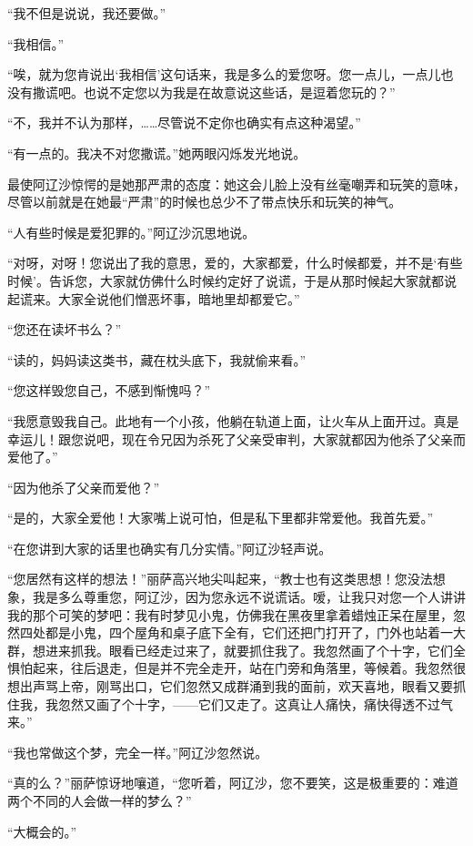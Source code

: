 \par “我不但是说说，我还要做。”
\par “我相信。”
\par “唉，就为您肯说出‘我相信’这句话来，我是多么的爱您呀。您一点儿，一点儿也没有撒谎吧。也说不定您以为我是在故意说这些话，是逗着您玩的？”
\par “不，我并不认为那样，……尽管说不定你也确实有点这种渴望。”
\par “有一点的。我决不对您撒谎。”她两眼闪烁发光地说。
\par 最使阿辽沙惊愕的是她那严肃的态度：她这会儿脸上没有丝毫嘲弄和玩笑的意味，尽管以前就是在她最“严肃”的时候也总少不了带点快乐和玩笑的神气。
\par “人有些时候是爱犯罪的。”阿辽沙沉思地说。
\par “对呀，对呀！您说出了我的意思，爱的，大家都爱，什么时候都爱，并不是‘有些时候’。告诉您，大家就仿佛什么时候约定好了说谎，于是从那时候起大家就都说起谎来。大家全说他们憎恶坏事，暗地里却都爱它。”
\par “您还在读坏书么？”
\par “读的，妈妈读这类书，藏在枕头底下，我就偷来看。”
\par “您这样毁您自己，不感到惭愧吗？”
\par “我愿意毁我自己。此地有一个小孩，他躺在轨道上面，让火车从上面开过。真是幸运儿！跟您说吧，现在令兄因为杀死了父亲受审判，大家就都因为他杀了父亲而爱他了。”
\par “因为他杀了父亲而爱他？”
\par “是的，大家全爱他！大家嘴上说可怕，但是私下里都非常爱他。我首先爱。”
\par “在您讲到大家的话里也确实有几分实情。”阿辽沙轻声说。
\par “您居然有这样的想法！”丽萨高兴地尖叫起来，“教士也有这类思想！您没法想象，我是多么尊重您，阿辽沙，因为您永远不说谎话。嗳，让我只对您一个人讲讲我的那个可笑的梦吧：我有时梦见小鬼，仿佛我在黑夜里拿着蜡烛正呆在屋里，忽然四处都是小鬼，四个屋角和桌子底下全有，它们还把门打开了，门外也站着一大群，想进来抓我。眼看已经走过来了，就要抓住我了。我忽然画了个十字，它们全惧怕起来，往后退走，但是并不完全走开，站在门旁和角落里，等候着。我忽然很想出声骂上帝，刚骂出口，它们忽然又成群涌到我的面前，欢天喜地，眼看又要抓住我，我忽然又画了个十字，——它们又走了。这真让人痛快，痛快得透不过气来。”
\par “我也常做这个梦，完全一样。”阿辽沙忽然说。
\par “真的么？”丽萨惊讶地嚷道，“您听着，阿辽沙，您不要笑，这是极重要的：难道两个不同的人会做一样的梦么？”
\par “大概会的。”
